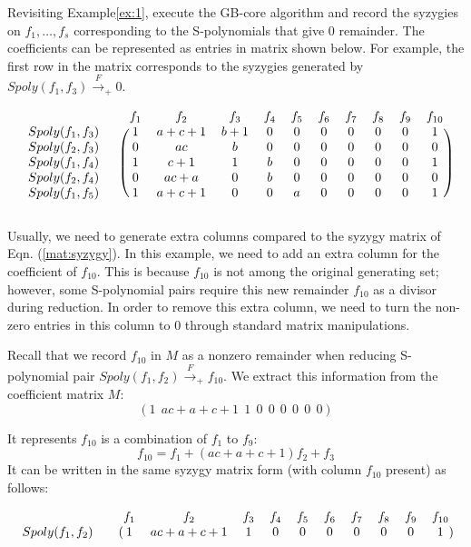  \begin{Example}
 Revisiting Example\ref{ex:1}, execute the GB-core algorithm and
 record the syzygies on $f_1,\dots,f_s$ corresponding to the
 S-polynomials that give 0 remainder. The coefficients can be
 represented as entries in matrix shown below. For example, the first
 row in the matrix corresponds to the syzygies generated by
 $Spoly(f_1,f_3)\xrightarrow{F}_+0$.  

\begin{equation}\label{eqn:sm}
 \begin{blockarray}{cccccccccccc}
  && f_1 & f_2 & f_3 & f_4 & f_5 & f_6 & f_7 & f_8 & f_9 & f_{10} \\
  \begin{block}{cc(cccccccccc)}
  Spoly(f_1,f_3)\ & & 1 & a+c+1 & b+1 &0&0&0&0&0&0&1\\
  Spoly(f_2,f_3)\ & & 0 & ac & b &0&0&0&0&0&0&0\\
  Spoly(f_1,f_4)\ & & 1 & c+1 & 1 &b&0&0&0&0&0&1\\
  Spoly(f_2,f_4)\ & & 0 & ac+a & 0 &b&0&0&0&0&0&0\\
  Spoly(f_1,f_5)\ & & 1 & a+c+1 & 0 &0&a&0&0&0&0&1\\
  \end{block}
  \end{blockarray}
\end{equation}

Usually, we need to generate extra columns compared to the syzygy
matrix of Eqn. (\ref{mat:syzygy}). In this example, we need to add an
extra column for the coefficient of $f_{10}$. This is because $f_{10}$
is not among the original generating set; however, some S-polynomial
pairs require this new remainder $f_{10}$ as a divisor during
reduction. In order to remove this extra column, we need to turn the
non-zero entries in this column to 0 through standard matrix
manipulations. 

Recall that we record $f_{10}$ in $M$ as a nonzero remainder when
reducing S-polynomial pair $Spoly(f_1,f_2)\xrightarrow{F}_+f_{10}$. We
extract this information from the coefficient matrix $M$:
 $$(1 ~~ac+a+c+1 ~~1 ~~0 ~~0 ~~0 ~~0 ~~0 ~~0 )$$

 It represents $f_{10}$ is a combination of $f_1$ to $f_9$:
 $$f_{10} = f_1 + (ac+a+c+1)f_2 + f_3$$
 It can be written in the same syzygy matrix form (with column
 $f_{10}$ present) as follows:

\begin{equation}\label{sr}%
 \begin{blockarray}{cccccccccccc}
  && f_1 & f_2 & f_3 & f_4 & f_5 & f_6 & f_7 & f_8 & f_9 & f_{10} \\
  \begin{block}{cc(cccccccccc)}
  Spoly(f_1,f_2)& & 1 & ac+a+c+1 & 1 &0&0&0&0&0&0&1\\
  \end{block}
  \end{blockarray}
 \end{equation}


\end{Example}
